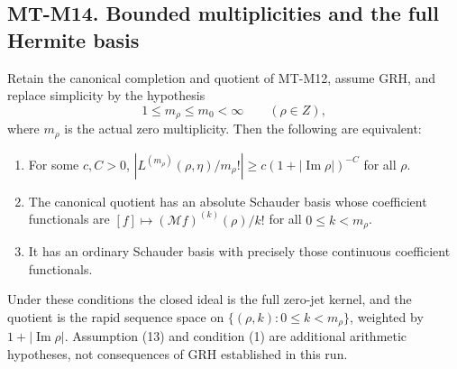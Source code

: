 \documentclass[11pt,a4paper]{article}
\begin{document}
\subsection*{MT-M14. Bounded multiplicities and the full Hermite basis}
Retain the canonical completion and quotient of MT-M12, assume
GRH, and replace simplicity by the hypothesis
\[
                  1\le m_\rho\le m_0<\infty
                              \qquad(\rho\in Z),       \tag{13}
\]
where $m_\rho$ is the actual zero multiplicity.
Then the following are equivalent:
\begin{enumerate}
\item For some $c,C>0$,
$|L^{(m_\rho)}(\rho,\eta)/m_\rho!|
       \ge c(1+|\operatorname{Im}\rho|)^{-C}$ for all $\rho$.
\item The canonical quotient has an absolute Schauder basis
whose coefficient functionals are
$[f]\mapsto(\mathcal Mf)^{(k)}(\rho)/k!$ for all
$0\le k<m_\rho$.
\item It has an ordinary Schauder basis with precisely those
continuous coefficient functionals.
\end{enumerate}
Under these conditions the closed ideal is the full zero-jet
kernel, and the quotient is the rapid sequence space on
$\{(\rho,k):0\le k<m_\rho\}$, weighted by
$1+|\operatorname{Im}\rho|$. Assumption (13) and condition (1)
are additional arithmetic hypotheses, not consequences of GRH
established in this run.
\end{document}
